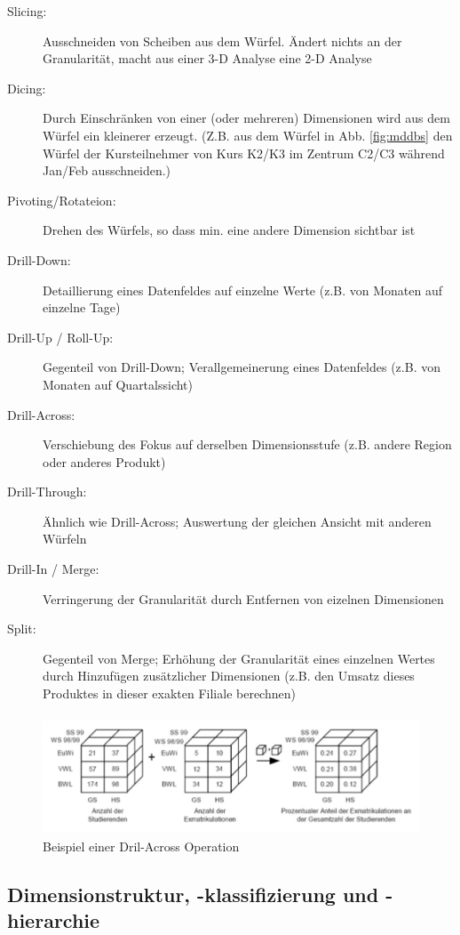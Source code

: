 \documentclass[a4paper, 11pt, nofootinbib]{article}
\begin{document}
\begin{description}
	\item[Slicing: ] Ausschneiden von Scheiben aus dem Würfel. Ändert nichts an der Granularität, macht aus einer 3-D Analyse eine 2-D Analyse
	\item[Dicing: ] Durch Einschränken von einer (oder mehreren) Dimensionen wird aus dem Würfel ein kleinerer erzeugt. (Z.B. aus dem Würfel in Abb. \ref{fig:mddbs} den Würfel der Kursteilnehmer von Kurs K2/K3 im Zentrum C2/C3 während Jan/Feb ausschneiden.)
	\item[Pivoting/Rotateion: ] Drehen des Würfels, so dass min. eine andere Dimension sichtbar ist
	\item[Drill-Down: ] Detaillierung eines Datenfeldes auf einzelne Werte (z.B. von Monaten auf einzelne Tage)
	\item[Drill-Up / Roll-Up: ] Gegenteil von Drill-Down; Verallgemeinerung eines Datenfeldes (z.B. von Monaten auf Quartalssicht)
	\item[Drill-Across: ] Verschiebung des Fokus auf derselben Dimensionsstufe (z.B. andere Region oder anderes Produkt)
	\item[Drill-Through: ] Ähnlich wie Drill-Across; Auswertung der gleichen Ansicht mit anderen Würfeln
	\item[Drill-In / Merge: ] Verringerung der Granularität durch Entfernen von eizelnen Dimensionen
	\item[Split: ] Gegenteil von Merge; Erhöhung der Granularität eines einzelnen Wertes durch Hinzufügen zusätzlicher Dimensionen (z.B. den Umsatz dieses Produktes in dieser exakten Filiale berechnen)
\end{description}

\begin{figure}[htb]
	\centering
	\includegraphics[keepaspectratio=true,height=8\baselineskip]{drill_across.jpg}
	\caption{Beispiel einer Dril-Across Operation}
	\label{fig:rel}
\end{figure}


\newpage

\subsection{Dimensionstruktur, -klassifizierung und -hierarchie}
\end{document}
